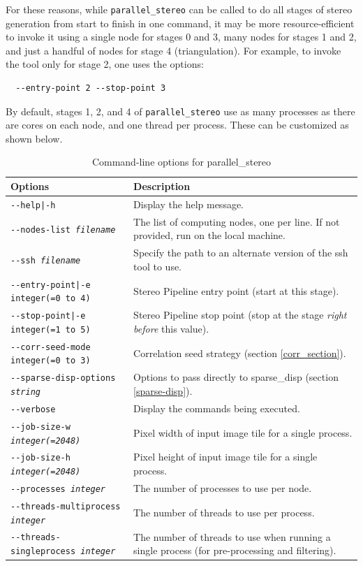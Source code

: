 For these reasons, while \texttt{parallel\_stereo} can be called to do
all stages of stereo generation from start to finish in one command, it
may be more resource-efficient to invoke it using a single node for
stages 0 and 3, many nodes for stages 1 and 2, and just a handful of
nodes for stage 4 (triangulation). For example, to invoke the tool
only for stage 2, one uses the options:

\begin{verbatim}
  --entry-point 2 --stop-point 3
\end{verbatim}

By default, stages 1, 2, and 4 of \texttt{parallel\_stereo} use
as many processes as there are cores on each node, and one thread per process.
These can be customized as shown below.

\begin{longtable}{|l|p{7.5cm}|}
\caption{Command-line options for parallel\_stereo}
\label{tbl:parallelstereo}
\endfirsthead
\endhead
\endfoot
\endlastfoot
\hline
Options & Description \\ \hline \hline
\texttt{-\/-help|-h} & Display the help message.\\ \hline
\texttt{-\/-nodes-list \textit{filename} } & The list of computing nodes,
one per line. If not provided, run on the local machine. \\ \hline
\texttt{-\/-ssh \textit{filename} } & Specify the path to an alternate version of the ssh tool to use.\\ \hline
\texttt{-\/-entry-point|-e integer(=0 to 4)} & Stereo Pipeline entry
point (start at this stage). \\ \hline
\texttt{-\/-stop-point|-e integer(=1 to 5)} & Stereo Pipeline stop point
(stop at the stage {\it right before} this value). \\ \hline
\texttt{-\/-corr-seed-mode integer(=0 to 3)} & Correlation seed strategy
(section \ref{corr_section}). \\ \hline
\texttt{-\/-sparse-disp-options \textit{string} } & Options to pass directly
to sparse\_disp (section \ref{sparse-disp}). \\ \hline
\texttt{-\/-verbose } & Display the commands being executed. \\ \hline
\texttt{-\/-job-size-w \textit{integer(=2048)}} & Pixel width of input
image tile for a single process. \\ \hline
\texttt{-\/-job-size-h \textit{integer(=2048)}} & Pixel height of input
image tile for a single process. \\ \hline
\texttt{-\/-processes \textit{integer}} & The number of processes to use per node. \\ \hline
\texttt{-\/-threads-multiprocess \textit{integer}} & The number of threads to use per process.\\ \hline
\texttt{-\/-threads-singleprocess \textit{integer}} & The number of threads to use when running a single process (for pre-processing and filtering).\\ \hline
\end{longtable}

